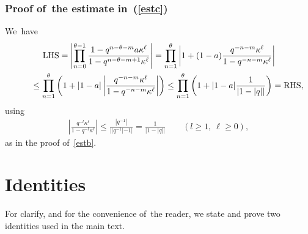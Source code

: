 \documentclass[11pt]{article}
\numberwithin{equation}{section}
\begin{document}
\subsubsection[Proof of~the estimate in (B.7)]{Proof of~the estimate in~(\ref{estc})}
We~have
\begin{gather*}
\text{LHS} = \left| \prod_{n=0}^{\theta-1} \frac{1- q^{n-\theta-m}a\kappa^\ell }{1-q^{n-\theta-m+1} \kappa^\ell } \right| = \prod_{n=1}^{\theta}\left| 1+(1-a)\frac{q^{-n-m}\kappa^\ell}{1-q^{-n-m}\kappa^\ell}\right|
\\ \hphantom{\text{LHS}}
{}\leq \prod_{n=1}^{\theta}\left( 1+|1-a|\left|\frac{q^{-n-m}\kappa^\ell}{1-q^{-n-m}\kappa^\ell}\right|\right)
\leq \prod_{n=1}^{\theta}\left( 1+|1-a|\frac{1}{|1-|q||}\right) =\text{RHS},
\end{gather*}
using
\begin{gather*}
\left|\frac{q^{-l}\kappa^\ell}{1-q^{-l}\kappa^\ell}\right|\leq \frac{|q^{-1}|}{||q^{-1}|-1|} = \frac{1}{|1-|q||} \qquad
(l\geq 1,\ \ell\geq 0),
\end{gather*}
as in the proof of~\eqref{estb}.


\setcounter{section}{3}
\setcounter{subsection}{2}
\setcounter{subsubsection}{0}
\setcounter{Theorem}{1}
\setcounter{equation}{10}
\section{Identities}\label{app:Id}
For clarify, and for the convenience of~the reader, we state and prove two identities used in the main text.
\end{document}

